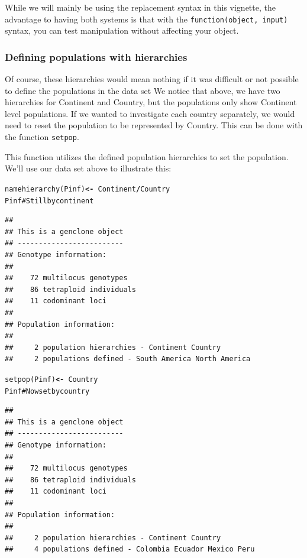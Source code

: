 \documentclass[letterpaper]{article}\usepackage[]{graphicx}\usepackage[]{color}
\makeatletter
\newcommand{\hlcom}[1]{\textcolor[rgb]{1,0.502,0}{#1}}%
\newcommand{\hlopt}[1]{\textcolor[rgb]{1,0,0.502}{\textbf{#1}}}%
\newcommand{\hlstd}[1]{\textcolor[rgb]{0,0,0}{#1}}%
\newcommand{\hlkwb}[1]{\textcolor[rgb]{0.502,0.502,0.753}{\textbf{#1}}}%
\newcommand{\hlkwd}[1]{\textcolor[rgb]{0,0.267,0.4}{#1}}%
\newenvironment{kframe}{%
 \def\at@end@of@kframe{}%
 \ifinner\ifhmode%
  \def\at@end@of@kframe{\end{minipage}}%
  \begin{minipage}{\columnwidth}%
 \fi\fi%
 \def\FrameCommand##1{\hskip\@totalleftmargin \hskip-\fboxsep
 \colorbox{shadecolor}{##1}\hskip-\fboxsep
     \hskip-\linewidth \hskip-\@totalleftmargin \hskip\columnwidth}%
 \MakeFramed {\advance\hsize-\width
   \@totalleftmargin\z@ \linewidth\hsize
   \@setminipage}}%
 {\par\unskip\endMakeFramed%
 \at@end@of@kframe}
\newenvironment{knitrout}{}{} %
\makeatother
\begin{document}
While we will mainly be using the replacement syntax in this vignette, the 
advantage to having both systems is that with the 
\texttt{function(object, input)} syntax, you can test manipulation without 
affecting your object.

\subsubsection{Defining populations with hierarchies}\label{data.manip:hier:setpop}

Of course, these hierarchies would mean nothing if it was difficult or not
possible to define the populations in the data set We notice that above, we have
two hierarchies for Continent and Country, but the populations only show Continent
level populations. If we wanted to investigate each country separately, we would
need to reset the population to be represented by Country. This can be done with
the function \texttt{setpop}.

This function utilizes the defined population hierarchies to set the population.
We'll use our data set above to illustrate this:

\begin{knitrout}\footnotesize
{}\color{fgcolor}\begin{kframe}
\begin{alltt}
\hlkwd{namehierarchy}\hlstd{(Pinf)} \hlkwb{<-} \hlopt{~}\hlstd{Continent}\hlopt{/}\hlstd{Country}
\hlstd{Pinf}  \hlcom{# Still by continent}
\end{alltt}
\begin{verbatim}
## 
## This is a genclone object
## -------------------------
## Genotype information:
## 
##    72 multilocus genotypes
##    86 tetraploid individuals
##    11 codominant loci
## 
## Population information:
## 
##     2 population hierarchies - Continent Country
##     2 populations defined - South America North America
\end{verbatim}
\begin{alltt}
\hlkwd{setpop}\hlstd{(Pinf)} \hlkwb{<-} \hlopt{~}\hlstd{Country}
\hlstd{Pinf}  \hlcom{# Now set by country}
\end{alltt}
\begin{verbatim}
## 
## This is a genclone object
## -------------------------
## Genotype information:
## 
##    72 multilocus genotypes
##    86 tetraploid individuals
##    11 codominant loci
## 
## Population information:
## 
##     2 population hierarchies - Continent Country
##     4 populations defined - Colombia Ecuador Mexico Peru
\end{verbatim}
\end{kframe}
\end{knitrout}
\end{document}
